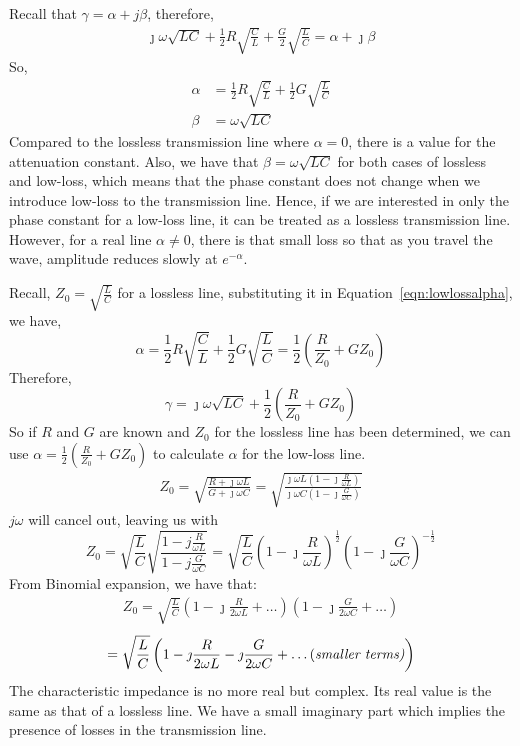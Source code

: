Recall that $\gamma = \alpha + j\beta$, therefore,
\begin{align*}
\jmath\omega\sqrt{LC} + \frac{1}{2}R\sqrt{\frac{C}{L}} + \frac{G}{2}\sqrt{\frac{L}{C}} = \alpha + \jmath\beta
\end{align*}
So,
\begin{align}
\alpha &= \frac{1}{2}R\sqrt{\frac{C}{L}} + \frac{1}{2}G\sqrt{\frac{L}{C}}\label{eqn:lowlossalpha}\\
\beta &= \omega\sqrt{LC}
\end{align}
Compared to the lossless transmission line where $\alpha = 0$, there is a value for the attenuation constant. Also, we have that $\beta = \omega\sqrt{LC}$ for both cases of lossless and low-loss, which means that the phase constant does not change when we introduce low-loss to the transmission line. Hence, if we are interested in only the phase constant for a low-loss line, it can be treated as a lossless transmission line. However, for a real line $\alpha \neq 0$, there is that small loss so that as you travel the wave, amplitude reduces slowly at $e^{-\alpha}$.

Recall, $Z_0 = \sqrt{\frac{L}{C}}$ for a lossless line, substituting it in Equation~\ref{eqn:lowlossalpha}, we have,
\[\alpha = \frac{1}{2}R\sqrt{\frac{C}{L}} + \frac{1}{2}G\sqrt{\frac{L}{C}} = \frac{1}{2}\left(\frac{R}{Z_0} + GZ_0\right)\]
Therefore,
\[\gamma = \jmath\omega\sqrt{LC} + \frac{1}{2}\left(\frac{R}{Z_0} + GZ_0\right)\]
So if $R$ and $G$ are known and $Z_0$ for the lossless line has been determined, we can use $\alpha = \frac{1}{2}(\frac{R}{Z_0} + GZ_0)$ to calculate $\alpha$ for the low-loss line.
\begin{align*}
Z_0 = \sqrt{\frac{R + \jmath\omega L}{G + \jmath\omega C}} = \sqrt{\frac{\jmath\omega L(1 - \jmath\frac{R}{\omega L})}{\jmath\omega C(1 - \jmath\frac{G}{\omega C})}}
\end{align*}
$j\omega$ will cancel out, leaving us with
\begin{dmath*}
Z_0 = \sqrt{\frac{L}{C}}\sqrt{\frac{1 - j\frac{R}{\omega L}}{1 - j\frac{G}{\omega C}}} =\sqrt{\frac{L}{C}}\left(1 - \jmath\frac{R}{\omega L}\right)^{\frac{1}{2}}\left(1 - \jmath\frac{G}{\omega C}\right)^{-\frac{1}{2}} 
\end{dmath*}
From Binomial expansion, we have that:
\begin{align*}
Z_0 = \sqrt{\frac{L}{C}}\left(1 - \jmath\frac{R}{2\omega L} + \ldots\right)\left(1 - \jmath\frac{G}{2\omega C} + \ldots\right)
\end{align*}
\begin{align*}
= \sqrt{\frac{L}{C}}\left(1 - \jmath\frac{R}{2\omega L} - \jmath\frac{G}{2\omega C} + \text{\ldots (\it{smaller terms})}\right)
\end{align*}
The characteristic impedance is no more real but complex. Its real value is the same as that of a lossless line. We have a small imaginary part which implies the presence of losses in the transmission line.

